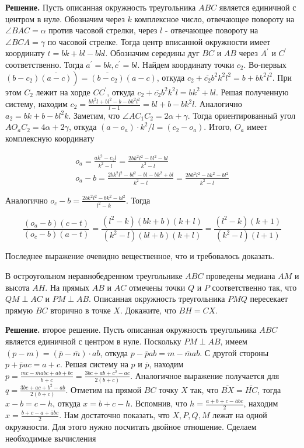 \textbf{Решение.}
Пусть описанная окружность треугольника $A B C$ является единичной с центром в нуле. Обозначим через $k$ комплексное число, отвечающее повороту на $\angle B A C=\alpha$ против часовой стрелки, через $l$ - отвечающее повороту на $\angle B C A=\gamma$ по часовой стрелке. Тогда центр вписанной окружности имеет координату $t=b k+b l-b k l$. Обозначим середины дуг $B C$ и $A B$ через $A^{\prime}$ и $C^{\prime}$ соответственно. Тогда $a^{\prime}=b k, c^{\prime}=b l$. Найдем координату точки $c_2$. Во-первых $\left.\left(b-c_2\right) \overline{(a-c)}\right)=\overline{\left(b-c_2\right)}(a-c)$, откуда $c_2+\overline{c_2} b^2 k^2 l^2=b+b k^2 l^2$. При этом $C_2$ лежит на хорде $C C^{\prime}$, откуда $c_2+\overline{c_2} b^2 k^2 l=b k^2+b l$. Решая полученную систему, находим $c_2=\frac{b k^2 l+b l^2-b-b k^2 l^2}{l-1}=b l+b-b k^2 l$. Аналогично $a_2=b k+b-b l^2 k$. Заметим, что $\angle A C_1 C_2=2 \alpha+\gamma$. Тогда ориентированный угол $A O_a C_2=4 \alpha+2 \gamma$, откуда $\left(a-o_a\right) \cdot k^2 / l=\left(c_2-o_a\right)$. Итого, $O_a$ имеет комплексную координату

$$
\begin{gathered}
o_a=\frac{a k^2-c_2 l}{k^2-l}=\frac{2 b k^2 l^2-b l^2-b l}{k^2-l} \\
o_a-b=\frac{2 b k^2 l^2-b l^2-b l-b k^2+b l}{k^2-l}=\frac{2 b k^2 l^2-b k^2-b l^2}{k^2-l}
\end{gathered}
$$


Аналогично $o_c-b=\frac{2 b k^2 l^2-b k^2-b l^2}{l^2-k}$. Тогда

$$
\frac{\left(o_a-b\right)(c-t)}{\left(o_c-b\right)(a-t)}=\frac{\left(l^2-k\right)(b k+b)(k+l)}{\left(k^2-l\right)(b l+b)(k+l)}=\frac{\left(l^2-k\right)(k+1)}{\left(k^2-l\right)(l+1)}
$$


Последнее выражение очевидно вещественное, что и требовалось доказать.


В остроугольном неравнобедренном треугольнике $A B C$ проведены медиана $A M$ и высота $A H$. На прямых $A B$ и $A C$ отмечены точки $Q$ и $P$ соответственно так, что $Q M \perp A C$ и $P M \perp A B$. Описанная окружность треугольника $P M Q$ пересекает прямую $B C$ вторично в точке $X$. Докажите, что $B H=C X$.

\textbf{Решение.}
второе решение. Пусть описанная окружность треугольника $A B C$ является единичной с центром в нуле. Поскольку $P M \perp A B$, имеем $(p-m)=(\bar{p}-\bar{m}) \cdot a b$, откуда $p-\bar{p} a b=m-\bar{m} a b$. С другой стороны $p+\bar{p} a c=a+c$. Решая систему на $p$ и $\bar{p}$, находим $p=\frac{m c-\bar{m} a b c+a b+b c}{b+c}=\frac{3 b c+a b+c^2-a c}{2(b+c)}$. Аналогичное выражение получается для $q=\frac{3 b c+a c+b^2-a b}{2(b+c)}$.
Отметим на прямой $B C$ точку $X$ так, что $\overline{B X}=\overline{H C}$, тогда $x-b=c-h$, откуда $x=b+c-h$. Вспомнив, что $h=\frac{a+b+c-\bar{a} b c}{2}$, находим $x=\frac{b+c-a+\bar{a} b c}{2}$.
Нам достаточно показать, что $X, P, Q, M$ лежат на одной окружности. Для этого нужно посчитать двойное отношение. Сделаем необходимые вычисления

